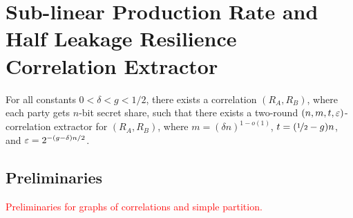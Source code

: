 \section{Sub-linear Production Rate and Half Leakage Resilience Correlation Extractor}
\begin{theorem}
	\label{thm:construction}
	For all constants $0<\delta<g<1/2$, there exists a correlation $(R_A,R_B)$, where each party gets $n$-bit secret share, such that there exists a two-round $(n,m,t,\varepsilon)$-correlation extractor for $(R_A,R_B)$, where $m=(\delta n)^{1-o(1)}$, $t=(\nicefrac12-g)n$, and $\varepsilon=2^{-(g-\delta)n/2}$. 
\end{theorem}

\subsection{Preliminaries}
\textcolor{red}{Preliminaries for graphs of correlations and simple partition.}

\begin{definition}
	
\end{definition}

\begin{definition}
	
\end{definition}

\begin{definition}
	
\end{definition}

\begin{definition}
	
\end{definition}